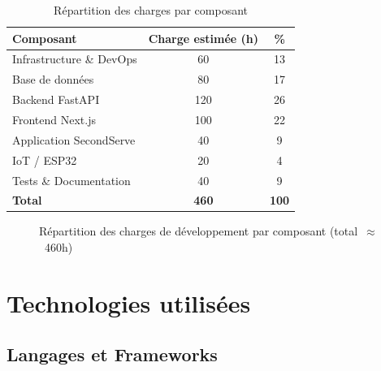 \documentclass[12pt,a4paper]{report}
\begin{document}
\begin{table}[H]
  \centering
  \caption{Répartition des charges par composant}
  \label{tab:charges}
  \begin{tabularx}{\linewidth}{Xcc}
    \toprule
    \textbf{Composant} & \textbf{Charge estimée (h)} & \textbf{\%} \\
    \midrule
    Infrastructure \& DevOps & 60  & 13 \\
    Base de données           & 80  & 17 \\
    Backend FastAPI           & 120 & 26 \\
    Frontend Next.js          & 100 & 22 \\
    Application SecondServe   & 40  &  9 \\
    IoT / ESP32               & 20  &  4 \\
    Tests \& Documentation    & 40  &  9 \\
    \midrule
    \textbf{Total}            & \textbf{460} & \textbf{100} \\
    \bottomrule
  \end{tabularx}
\end{table}

\begin{figure}[H]
\centering
{}
\caption{Répartition des charges de développement par composant (total~$\approx$~460h)}
\label{fig:3.2}
\end{figure}

\section{Technologies utilisées}

\subsection{Langages et Frameworks}
\end{document}
